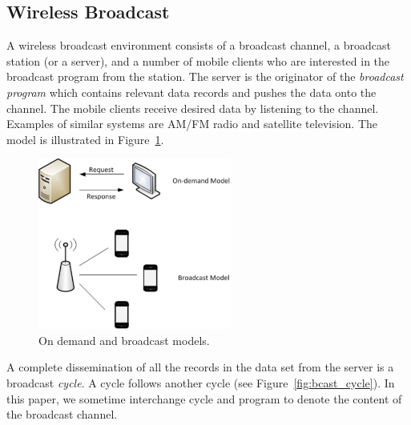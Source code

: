 \documentclass{sig-alternate}
\newtheorem{mydef}{Definition}
\begin{document}

\subsection{Wireless Broadcast}\label{sec:wireless_broadcast}
A wireless broadcast environment consists of a broadcast channel,
a broadcast station (or a server), and a number of mobile clients
who are interested in the broadcast program from the station. The server
is the originator of the \emph{broadcast program} which contains relevant
data records and pushes the data onto the channel. The mobile clients
receive desired data by listening to the channel. Examples of similar
systems are AM/FM radio and satellite television. The model is illustrated in
Figure~\ref{fig:broadcast}.

\begin{figure}[h]
\begin{center}
\includegraphics[width=2.5in]{Figures/on_demand-eps-converted-to.pdf}
\caption{\small On demand and broadcast models.\label{fig:broadcast}}
\end{center}
\end{figure}

A complete dissemination of all the records in the data set from the server
is a broadcast \emph{cycle}. A cycle follows another cycle (see
Figure~\ref{fig:bcast_cycle}). In this
paper, we sometime interchange cycle and program to denote the content of
the broadcast channel.
\end{document}
